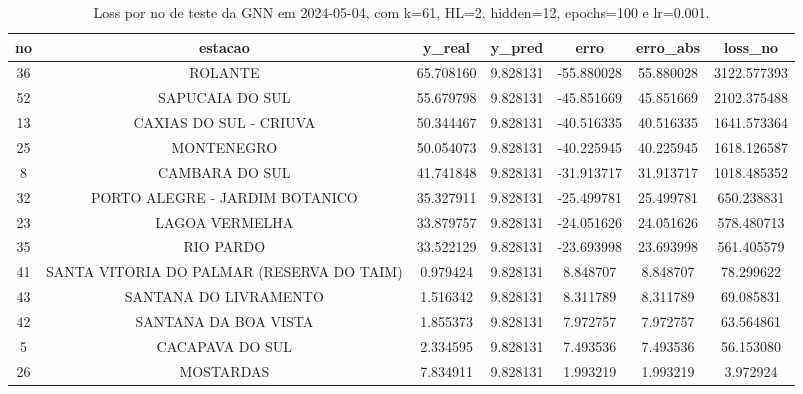 \begin{table}[h]
\centering
\caption{Loss por no de teste da GNN em 2024-05-04, com k=61, HL=2, hidden=12, epochs=100 e lr=0.001.}
\label{tab:gnn_loss_k61_hl2_h12_e100_d20240504}
\begin{tabular}{ccccccc}
\toprule
no & estacao & y\_real & y\_pred & erro & erro\_abs & loss\_no \\
\midrule
36 & ROLANTE & 65.708160 & 9.828131 & -55.880028 & 55.880028 & 3122.577393 \\
52 & SAPUCAIA DO SUL & 55.679798 & 9.828131 & -45.851669 & 45.851669 & 2102.375488 \\
13 & CAXIAS DO SUL - CRIUVA & 50.344467 & 9.828131 & -40.516335 & 40.516335 & 1641.573364 \\
25 & MONTENEGRO & 50.054073 & 9.828131 & -40.225945 & 40.225945 & 1618.126587 \\
8 & CAMBARA DO SUL & 41.741848 & 9.828131 & -31.913717 & 31.913717 & 1018.485352 \\
32 & PORTO ALEGRE - JARDIM BOTANICO & 35.327911 & 9.828131 & -25.499781 & 25.499781 & 650.238831 \\
23 & LAGOA VERMELHA & 33.879757 & 9.828131 & -24.051626 & 24.051626 & 578.480713 \\
35 & RIO PARDO & 33.522129 & 9.828131 & -23.693998 & 23.693998 & 561.405579 \\
41 & SANTA VITORIA DO PALMAR (RESERVA DO TAIM) & 0.979424 & 9.828131 & 8.848707 & 8.848707 & 78.299622 \\
43 & SANTANA DO LIVRAMENTO & 1.516342 & 9.828131 & 8.311789 & 8.311789 & 69.085831 \\
42 & SANTANA DA BOA VISTA & 1.855373 & 9.828131 & 7.972757 & 7.972757 & 63.564861 \\
5 & CACAPAVA DO SUL & 2.334595 & 9.828131 & 7.493536 & 7.493536 & 56.153080 \\
26 & MOSTARDAS & 7.834911 & 9.828131 & 1.993219 & 1.993219 & 3.972924 \\
\bottomrule
\end{tabular}
\end{table}
